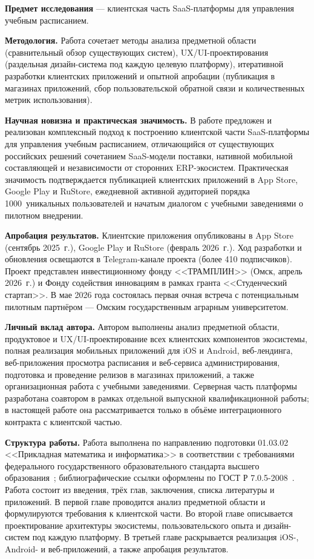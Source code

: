 \textbf{Предмет исследования} --- клиентская часть SaaS-платформы для управления учебным расписанием.

\textbf{Методология.} Работа сочетает методы анализа предметной области (сравнительный обзор существующих систем), UX/UI-проектирования (раздельная дизайн-система под каждую целевую платформу), итеративной разработки клиентских приложений и опытной апробации (публикация в магазинах приложений, сбор пользовательской обратной связи и количественных метрик использования).

\textbf{Научная новизна и практическая значимость.} В работе предложен и реализован комплексный подход к построению клиентской части SaaS-платформы для управления учебным расписанием, отличающийся от существующих российских решений сочетанием SaaS-модели поставки, нативной мобильной составляющей и независимости от сторонних ERP-экосистем. Практическая значимость подтверждается публикацией клиентских приложений в App Store, Google Play и RuStore, ежедневной активной аудиторией порядка 1000~уникальных пользователей и начатым диалогом с учебными заведениями о пилотном внедрении.

\textbf{Апробация результатов.} Клиентские приложения опубликованы в App Store (сентябрь 2025~г.), Google Play и RuStore (февраль 2026~г.). Ход разработки и обновления освещаются в Telegram-канале проекта (более 410 подписчиков). Проект представлен инвестиционному фонду <<ТРАМПЛИН>> (Омск, апрель 2026~г.) и Фонду содействия инновациям в рамках гранта <<Студенческий стартап>>. В мае 2026 года состоялась первая очная встреча с потенциальным пилотным партнёром --- Омским государственным аграрным университетом.

\textbf{Личный вклад автора.} Автором выполнены анализ предметной области, продуктовое и UX/UI-проектирование всех клиентских компонентов экосистемы, полная реализация мобильных приложений для iOS и Android, веб-лендинга, веб-приложения просмотра расписания и веб-сервиса администрирования, подготовка и проведение релизов в магазинах приложений, а также организационная работа с учебными заведениями. Серверная часть платформы разработана соавтором в рамках отдельной выпускной квалификационной работы; в настоящей работе она рассматривается только в объёме интеграционного контракта с клиентской частью.

\textbf{Структура работы.} Работа выполнена по направлению подготовки 01.03.02 <<Прикладная математика и информатика>> в соответствии с требованиями федерального государственного образовательного стандарта высшего образования~\cite{fgos-01-03-02}; библиографические ссылки оформлены по ГОСТ Р 7.0.5-2008~\cite{gost-7-0-5-2008}. Работа состоит из введения, трёх глав, заключения, списка литературы и приложений. В первой главе проводится анализ предметной области и формулируются требования к клиентской части. Во второй главе описывается проектирование архитектуры экосистемы, пользовательского опыта и дизайн-систем под каждую платформу. В третьей главе раскрывается реализация iOS-, Android- и веб-приложений, а также апробация результатов.
